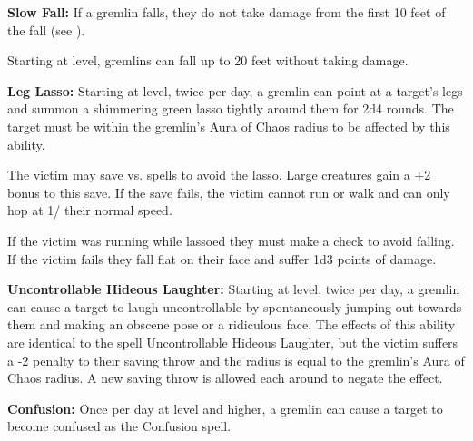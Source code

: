\begin{multicols*}{2}
\textbf{Slow Fall:} If a gremlin falls, they do not take damage from the first 10 feet of the fall (see ). 

Starting at  level, gremlins can fall up to 20 feet without taking damage.

\textbf{Leg Lasso:} Starting at  level, twice per day, a gremlin can point at a target's legs and summon a shimmering green lasso tightly around them for 2d4 rounds. The target must be within the gremlin's Aura of Chaos radius to be affected by this ability.

The victim may save vs. spells to avoid the lasso. Large creatures gain a +2 bonus to this save. If the save fails, the victim cannot run or walk and can only hop at 1/ their normal speed.

If the victim was running while lassoed they must make a  check to avoid falling. If the victim fails they fall flat on their face and suffer 1d3 points of damage.

\textbf{Uncontrollable Hideous Laughter:} Starting at  level, twice per day, a gremlin can cause a target to laugh uncontrollable by spontaneously jumping out towards them and making an obscene pose or a ridiculous face. The effects of this ability are identical to the spell Uncontrollable Hideous Laughter, but the victim suffers a -2 penalty to their saving throw and the radius is equal to the gremlin's Aura of Chaos radius. A new saving throw is allowed each around to negate the effect.

\textbf{Confusion:} Once per day at  level and higher, a gremlin can cause a target to become confused as the Confusion spell.



\end{multicols*}
